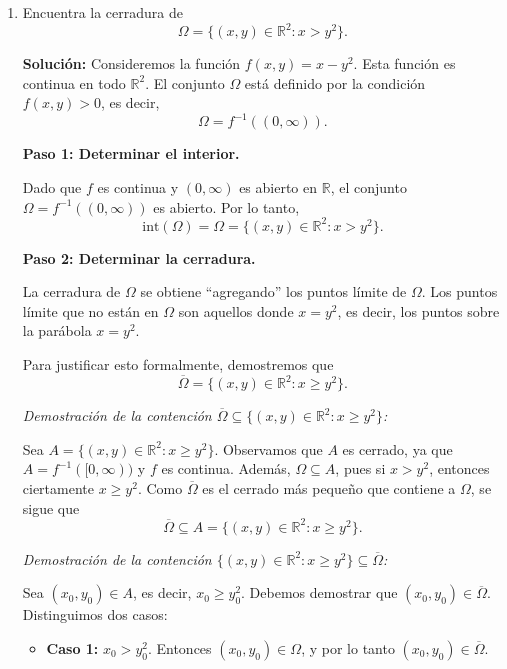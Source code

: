 \documentclass[12pt]{article}
\newcommand{\Int}{\mathrm{int}}
\newcommand{\R}{\mathbb R}
\begin{document}
\begin{enumerate}
Como $\mathbf{z} \in \Omega + \Delta$ era arbitrario, hemos demostrado que todo punto de $\Omega + \Delta$ tiene una bola abierta centrada en él completamente contenida en $\Omega + \Delta$. Por lo tanto,
\[
\Omega + \Delta \text{ es abierto.}
\]

\item Encuentra la cerradura de 
\[ \Omega = \{ (x,y)\in \R^2 : x > y^2 \}. \]

\textbf{Solución: }
Consideremos la función $f(x,y) = x - y^2$. Esta función es continua en todo $\R^2$. El conjunto $\Omega$ está definido por la condición $f(x,y) > 0$, es decir,
\[
\Omega = f^{-1}((0, \infty)).
\]

\textbf{Paso 1: Determinar el interior.}

Dado que $f$ es continua y $(0, \infty)$ es abierto en $\R$, el conjunto $\Omega = f^{-1}((0, \infty))$ es abierto. Por lo tanto,
\[
\Int(\Omega) = \Omega = \{ (x,y)\in \R^2 : x > y^2 \}.
\]

\textbf{Paso 2: Determinar la cerradura.}

La cerradura de $\Omega$ se obtiene ``agregando'' los puntos límite de $\Omega$. Los puntos límite que no están en $\Omega$ son aquellos donde $x = y^2$, es decir, los puntos sobre la parábola $x = y^2$.

Para justificar esto formalmente, demostremos que
\[
\overline{\Omega} = \{ (x,y)\in \R^2 : x \geq y^2 \}.
\]

\textit{Demostración de la contención $\overline{\Omega} \subseteq \{ (x,y)\in \R^2 : x \geq y^2 \}$:}

Sea $A = \{ (x,y)\in \R^2 : x \geq y^2 \}$. Observamos que $A$ es cerrado, ya que $A = f^{-1}([0, \infty))$ y $f$ es continua. Además, $\Omega \subseteq A$, pues si $x > y^2$, entonces ciertamente $x \geq y^2$. Como $\overline{\Omega}$ es el cerrado más pequeño que contiene a $\Omega$, se sigue que
\[
\overline{\Omega} \subseteq A = \{ (x,y)\in \R^2 : x \geq y^2 \}.
\]

\textit{Demostración de la contención $\{ (x,y)\in \R^2 : x \geq y^2 \} \subseteq \overline{\Omega}$:}

Sea $(x_0, y_0) \in A$, es decir, $x_0 \geq y_0^2$. Debemos demostrar que $(x_0, y_0) \in \overline{\Omega}$. Distinguimos dos casos:

\begin{itemize}
    \item \textbf{Caso 1:} $x_0 > y_0^2$. Entonces $(x_0, y_0) \in \Omega$, y por lo tanto $(x_0, y_0) \in \overline{\Omega}$.
    

\end{itemize}
\end{enumerate}
\end{document}
